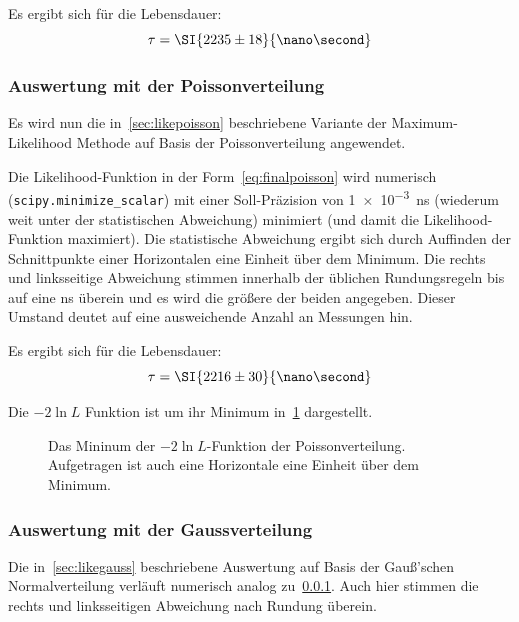 \documentclass[slug=LM, room=Andreas-Schubert-Bau\,\ K\ 1A, supervisor=Anne-Sophie\ Berthold, coursedate=13.\ 12.\ 2019]{../../Lab_Report_LaTeX/lab_report}
\begin{document}
Es ergibt sich f\"ur die Lebensdauer:
\begin{equation}
  \label{eq:result-exponential}
  \tau = \SI{2235\pm 18}{\nano\second}
\end{equation}

\subsubsection{Auswertung mit der Poissonverteilung}
\label{sec:auw-poisson}

Es wird nun die in~\ref{sec:likepoisson} beschriebene Variante der
Maximum-Likelihood Methode auf Basis der Poissonverteilung angewendet.

Die Likelihood-Funktion in der Form~\ref{eq:finalpoisson} wird
numerisch (\verb|scipy.minimize_scalar|) mit einer Soll-Pr\"azision
von \SI{1e-3}{\nano\second} (wiederum weit unter der statistischen
Abweichung) minimiert (und damit die Likelihood-Funktion maximiert). Die
statistische Abweichung ergibt sich durch Auffinden der Schnittpunkte
einer Horizontalen eine Einheit \"uber dem Minimum. Die rechts und
linksseitige Abweichung stimmen innerhalb der \"ublichen
Rundungsregeln bis auf eine \si{\nano\second} \"uberein und es wird
die gr\"o\ss{}ere der beiden angegeben. Dieser Umstand deutet auf eine
ausweichende Anzahl an Messungen hin.

Es ergibt sich f\"ur die Lebensdauer:
\begin{equation}
  \label{eq:result-poisson}
  \tau = \SI{2216\pm 30}{\nano\second}
\end{equation}

Die \(-2\ln{L}\) Funktion ist um ihr Minimum
in~\ref{fig:haupt-poisson} dargestellt.

\begin{figure}[h]\centering
  
  \caption{Das Mininum der \(-2\ln{L}\)-Funktion der
    Poissonverteilung. Aufgetragen ist auch eine Horizontale eine
    Einheit \"uber dem Minimum.}
  \label{fig:haupt-poisson}
\end{figure}

\subsubsection{Auswertung mit der Gaussverteilung}
\label{sec:auw-gauss}

Die in~\ref{sec:likegauss} beschriebene Auswertung auf Basis der
Gauß'schen Normalverteilung verl\"auft numerisch analog
zu~\ref{sec:auw-poisson}. Auch hier stimmen die rechts und
linksseitigen Abweichung nach Rundung \"uberein.
\end{document}
